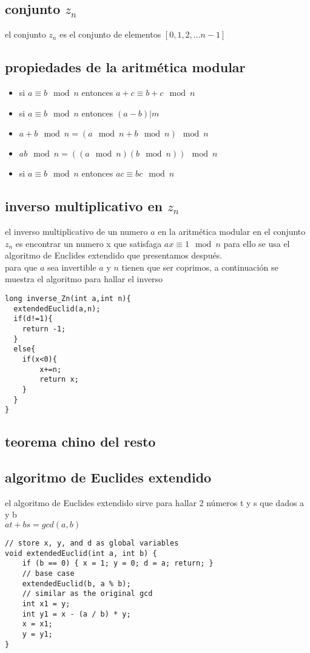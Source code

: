 \documentclass[11pt,a4paper]{book}
\begin{document}
\subsection{conjunto $z_{n}$}
el conjunto $z_{n}$ es el conjunto de elementos $[0 , 1, 2, . . . n-1]$
\subsection{propiedades de la aritmética modular}
\begin{itemize}
\item si $a\equiv b \mod{n}$ entonces $a+c\equiv b+c \mod{n}$
\item si $a\equiv b \mod{n}$ entonces $(a-b) | m$
\item $a+b \mod{n} = (a\mod{n}+b\mod{n}) \mod{n}$
\item $ab \mod{n} = ((a\mod{n}) (b\mod{n})) \mod{n}$
\item si $a\equiv b \mod{n}$ entonces $ac\equiv bc \mod{n}$
\end{itemize}
\subsection{inverso multiplicativo en $z_{n}$}
el inverso multiplicativo de un numero $a$ en la aritmética modular en el conjunto $z_{n}$ es encontrar un numero 
x que satisfaga $ax \equiv 1 \mod{n}$ para ello se usa el algoritmo de Euclides extendido que presentamos después.\\
para que $a$ sea invertible $a$ y $n$ tienen que ser coprimos, a continuación se muestra el algoritmo para hallar el inverso
\begin{lstlisting}[style=C]
long inverse_Zn(int a,int n){
  extendedEuclid(a,n);   
  if(d!=1){
  	return -1;
  }
  else{
  	if(x<0){
  		x+=n;
   		return x;
  	}
  }  
}
\end{lstlisting}
\subsection{teorema chino del resto}
\subsection{algoritmo de Euclides extendido}
el algoritmo de Euclides extendido sirve para hallar 2 números t y s que dados a y b\\
$at+bs=gcd(a,b)$
\begin{lstlisting}[style=C]
// store x, y, and d as global variables
void extendedEuclid(int a, int b) {
	if (b == 0) { x = 1; y = 0; d = a; return; }
	// base case
	extendedEuclid(b, a % b);
	// similar as the original gcd
	int x1 = y;
	int y1 = x - (a / b) * y;
	x = x1;
	y = y1;
}
\end{lstlisting}
\end{document}
